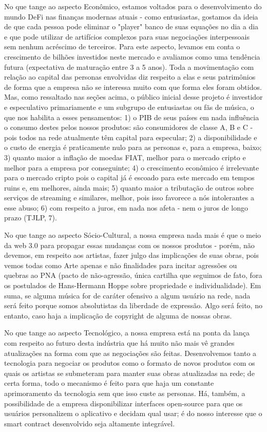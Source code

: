 \documentclass[onecolumn,12pt]{asme2ej}
\begin{document}
No que tange ao aspecto Econômico, estamos voltados para o desenvolvimento do mundo DeFi nas finanças modernas atuais - como entusiastas, gostamos da ideia de que cada pessoa pode eliminar o "player" banco de suas equações no dia a dia e que pode utilizar de artifícios complexos para suas negociações interpessoais sem nenhum acréscimo de terceiros. Para este aspecto, levamos em conta o crescimento de bilhões investidos neste mercado e avaliamos como uma tendência futura (expectativa de maturação entre 3 a 5 anos)\cite{defi}. Toda a movimentação com relação ao capital das personas envolvidas diz respeito a elas e seus patrimônios de forma que a empresa não se interessa muito com que forma eles foram obtidos. Mas, como ressaltado nas seções acima, o público inicial desse projeto é investidor e especulativo primariamente e um subgrupo de entusiastas ou fãs de música, o que nos habilita a esses pensamentos: 1) o PIB de seus países em nada influência o consumo destes pelos nossos produtos: são consumidores de classe A, B e C - pois todos na rede atualmente têm capital para especular; 2) a disponibilidade e o custo de energia é praticamente nulo para as personas e, para a empresa, baixo; 3) quanto maior a inflação de moedas FIAT, melhor para o mercado cripto e melhor para a empresa por conseguinte; 4) o crescimento econômico é irrelevante para o mercado cripto pois o capital já é escoado para este mercado em tempos ruins e, em melhores, ainda mais; 5) quanto maior a tributação de outros sobre serviços de streaming e similares, melhor, pois isso favorece a nós intolerantes a esse abuso; 6) com respeito a juros, em nada nos afeta - nem o juros de longo prazo (TJLP, 7).

No que tange ao aspecto Sócio-Cultural, a nossa empresa nada mais é que o meio da web 3.0 para propagar essas mudanças com os nossos produtos - porém, não devemos, em respeito aos artistas, fazer julgo das implicações de suas obras, pois vemos todas como Arte apenas e não finalidades para incitar agressões ou quebras ao PNA (pacto de não-agressão, única cartilha que seguimos de fato, fora os postulados de Hans-Hermann Hoppe sobre propriedade e individualidade). Em suma, se alguma música for de caráter ofensivo a algum usuário na rede, nada será feito porque somos absolutistas da liberdade de expressão. Algo será feito, no entanto, caso haja a implicação de copyright de alguma de nossas obras.

No que tange ao aspecto Tecnológico, a nossa empresa está na ponta da lança com respeito ao futuro desta indústria que há muito não mais vê grandes atualizações na forma com que as negociações são feitas. Desenvolvemos tanto a tecnologia para negociar os produtos como o formato de novos produtos com os quais os artistas se submeteram para manter suas obras atualizadas na rede; de certa forma, todo o mecanismo é feito para que haja um constante aprimoramento da tecnologia sem que isso custe as personas. Há, também, a possibilidade de a empresa disponibilizar interfaces open-source para que os usuários personalizem o aplicativo e decidam qual usar; é do nosso interesse que o smart contract desenvolvido seja altamente integrável.
\end{document}
